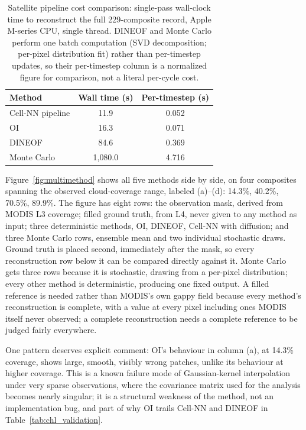 \documentclass[final,5p,times,twocolumn,authoryear]{elsarticle}
\begin{document}
\begin{table}[t]
\centering
\small
\caption{Satellite pipeline cost comparison: single-pass wall-clock
time to reconstruct the full 229-composite record, Apple M-series
CPU, single thread. DINEOF and Monte Carlo perform one batch
computation (SVD decomposition; per-pixel distribution fit) rather
than per-timestep updates, so their per-timestep column is a
normalized figure for comparison, not a literal per-cycle cost.}
\label{tab:sat_cost}
\begin{tabular}{lcc}
\toprule
Method & Wall time (s) & Per-timestep (s) \\
\midrule
Cell-NN pipeline & 11.9 & 0.052 \\
OI               & 16.3 & 0.071 \\
DINEOF           & 84.6 & 0.369 \\
Monte Carlo      & 1{,}080.0 & 4.716 \\
\bottomrule
\end{tabular}
\end{table}

Figure~\ref{fig:multimethod} shows all five methods side by side, on
four composites spanning the observed cloud-coverage range, labeled
(a)--(d): 14.3\%, 40.2\%, 70.5\%, 89.9\%. The figure has eight rows:
the observation mask, derived from MODIS L3 coverage; filled ground
truth, from L4, never given to any method as input; three
deterministic methods, OI, DINEOF, Cell-NN with diffusion; and three
Monte Carlo rows, ensemble mean and two individual stochastic draws.
Ground truth is placed second, immediately after the mask, so every
reconstruction row below it can be compared directly against it.
Monte Carlo gets three rows because it is stochastic, drawing from a
per-pixel distribution; every other method is deterministic,
producing one fixed output. A filled reference is needed rather than
MODIS's own gappy field because every method's reconstruction is
complete, with a value at every pixel including ones MODIS itself
never observed; a complete reconstruction needs a complete reference
to be judged fairly everywhere.

One pattern deserves explicit comment: OI's behaviour in column (a),
at 14.3\% coverage, shows large, smooth, visibly wrong patches,
unlike its behaviour at higher coverage. This is a known failure mode
of Gaussian-kernel interpolation under very sparse observations, where
the covariance matrix used for the analysis becomes nearly singular;
it is a structural weakness of the method, not an implementation bug,
and part of why OI trails Cell-NN and DINEOF in
Table~\ref{tab:chl_validation}.
\end{document}

